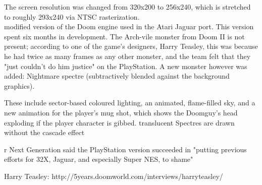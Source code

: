   \par



The screen resolution was changed from 320x200 to 256x240, which is stretched to roughly 293x240 via NTSC rasterization.\\
modified version of the Doom engine used in the Atari Jaguar port. This version spent six months in development. The Arch-vile monster from Doom II is not present; according to one of the game's designers, Harry Teasley, this was because he had twice as many frames as any other monster, and the team felt that they "just couldn't do him justice" on the PlayStation. A new monster however was added: Nightmare spectre (subtractively blended against the background graphics).\\
\par
 These include sector-based coloured lighting, an animated, flame-filled sky, and a new animation for the player's mug shot, which shows the Doomguy's head exploding if the player character is gibbed. translucent Spectres are drawn without the cascade effect \\
\par
r Next Generation said the PlayStation version succeeded in "putting previous efforts for 32X, Jaguar, and especially Super NES, to shame" 
\par
Harry Teasley: http://5years.doomworld.com/interviews/harryteasley/\\



\pagebreak
